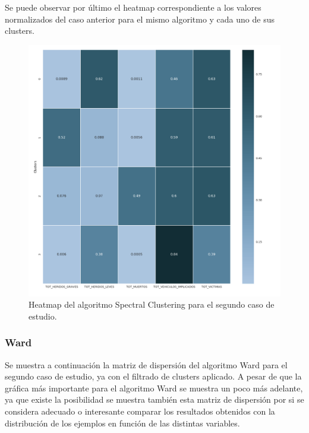 	Se puede observar por último el heatmap correspondiente a los valores normalizados del caso anterior para el mismo algoritmo y cada uno de sus clusters.
	
	\begin{figure}[H]
		\centering
		\includegraphics[scale=0.4]{heatmaps/SpectralClustering-EarlyMorningAccidents-Heatmap.png}
		\caption{Heatmap del algoritmo Spectral Clustering para el segundo caso de estudio.}
	\end{figure}
	
	\subsubsection{Ward}
	Se muestra a continuación la matriz de dispersión del algoritmo Ward para el segundo caso de estudio, ya con el filtrado de clusters aplicado. A pesar de que la gráfica más importante para el algoritmo Ward se muestra un poco más adelante, ya que existe la posibilidad se muestra también esta matriz de dispersión por si se considera adecuado o interesante comparar los resultados obtenidos con la distribución de los ejemplos en función de las distintas variables.
	
